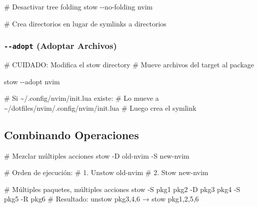 \documentclass[
  doc,
  floatsintext,
  longtable,
  a4paper,
  nolmodern,
  notxfonts,
  notimes,
  12pt,
  colorlinks=true,linkcolor=blue,citecolor=blue,urlcolor=blue]{apa7}
\newenvironment{Shaded}{\begin{snugshade}}{\end{snugshade}}
\newcommand{\AttributeTok}[1]{\textcolor[rgb]{0.40,0.45,0.13}{#1}}
\newcommand{\CommentTok}[1]{\textcolor[rgb]{0.37,0.37,0.37}{#1}}
\newcommand{\ExtensionTok}[1]{\textcolor[rgb]{0.00,0.23,0.31}{#1}}
\newcommand{\NormalTok}[1]{\textcolor[rgb]{0.00,0.23,0.31}{#1}}
\begin{document}
\begin{Shaded}
\begin{Highlighting}[]
\CommentTok{\# Desactivar tree folding}
\ExtensionTok{stow} \AttributeTok{{-}{-}no{-}folding}\NormalTok{ nvim}

\CommentTok{\# Crea directorios en lugar de symlinks a directorios}
\end{Highlighting}
\end{Shaded}

\subsubsection{\texorpdfstring{\texttt{-\/-adopt} (Adoptar
Archivos)}{-\/-adopt (Adoptar Archivos)}}\label{adopt-adoptar-archivos}

\begin{Shaded}
\begin{Highlighting}[]
\CommentTok{\# CUIDADO: Modifica el stow directory}
\CommentTok{\# Mueve archivos del target al package}

\ExtensionTok{stow} \AttributeTok{{-}{-}adopt}\NormalTok{ nvim}

\CommentTok{\# Si \textasciitilde{}/.config/nvim/init.lua existe:}
\CommentTok{\# Lo mueve a \textasciitilde{}/dotfiles/nvim/.config/nvim/init.lua}
\CommentTok{\# Luego crea el symlink}
\end{Highlighting}
\end{Shaded}

\subsection{Combinando Operaciones}\label{combinando-operaciones}

\begin{Shaded}
\begin{Highlighting}[]
\CommentTok{\# Mezclar múltiples acciones}
\ExtensionTok{stow} \AttributeTok{{-}D}\NormalTok{ old{-}nvim }\AttributeTok{{-}S}\NormalTok{ new{-}nvim}

\CommentTok{\# Orden de ejecución:}
\CommentTok{\# 1. Unstow old{-}nvim}
\CommentTok{\# 2. Stow new{-}nvim}

\CommentTok{\# Múltiples paquetes, múltiples acciones}
\ExtensionTok{stow} \AttributeTok{{-}S}\NormalTok{ pkg1 pkg2 }\AttributeTok{{-}D}\NormalTok{ pkg3 pkg4 }\AttributeTok{{-}S}\NormalTok{ pkg5 }\AttributeTok{{-}R}\NormalTok{ pkg6}
\CommentTok{\# Resultado: unstow pkg3,4,6 → stow pkg1,2,5,6}
\end{Highlighting}
\end{Shaded}
\end{document}
